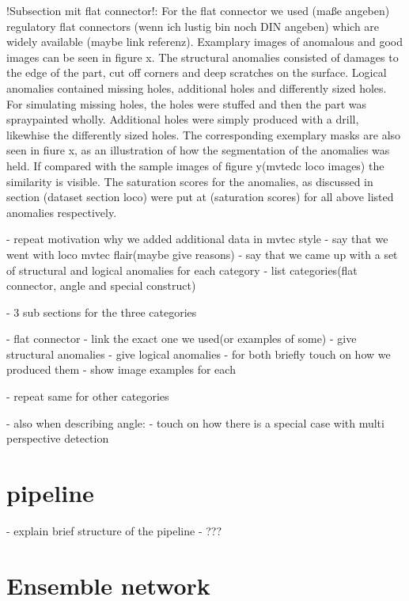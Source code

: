 !Subsection mit flat connector!:
For the flat connector we used (maße angeben) regulatory flat connectors (wenn ich lustig bin noch DIN angeben) which are widely available (maybe link referenz). 
Examplary images of anomalous and good images can be seen in figure x. The structural anomalies consisted of damages to the edge of the part, cut off corners and deep scratches on the surface. 
Logical anomalies contained missing holes, additional holes and differently sized holes. For simulating missing holes, the holes were stuffed and then the part was spraypainted wholly. 
Additional holes were simply produced with a drill, likewhise the differently sized holes. 
The corresponding exemplary masks are also seen in fiure x, as an illustration of how the segmentation of the anomalies was held. If compared with the sample images of figure y(mvtedc loco images) 
the similarity is visible. The saturation scores for the anomalies, as discussed in section (dataset section loco) were put at (saturation scores) for all above listed anomalies respectively.



- repeat motivation why we added additional data in mvtec style
- say that we went with loco mvtec flair(maybe give reasons)
- say that we came up with a set of structural and logical anomalies for each category
- list categories(flat connector, angle and special construct)

- 3 sub sections for the three categories

- flat connector
- link the exact one we used(or examples of some)
- give structural anomalies
- give logical anomalies
- for both briefly touch on how we produced them
- show image examples for each

- repeat same for other categories

- also when describing angle:
- touch on how there is a special case with multi perspective detection





\section{pipeline}
- explain brief structure of the pipeline
- ???


\section{Ensemble network}
\label{sec:ourensemblenetwork}

